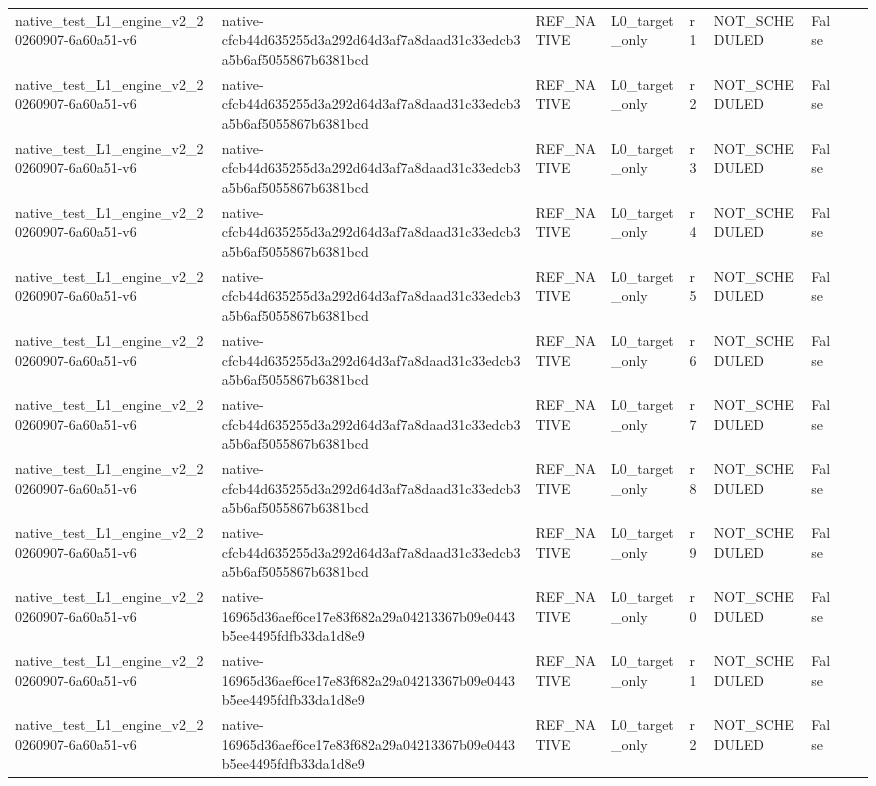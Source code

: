 \begin{tabular}{lllllllll}
native\_test\_L1\_engine\_v2\_20260907-6a60a51-v6 & native-cfcb44d635255d3a292d64d3af7a8daad31c33edcb3a5b6af5055867b6381bcd & REF\_NATIVE & L0\_target\_only & r1 & NOT\_SCHEDULED & False &  &  \\
native\_test\_L1\_engine\_v2\_20260907-6a60a51-v6 & native-cfcb44d635255d3a292d64d3af7a8daad31c33edcb3a5b6af5055867b6381bcd & REF\_NATIVE & L0\_target\_only & r2 & NOT\_SCHEDULED & False &  &  \\
native\_test\_L1\_engine\_v2\_20260907-6a60a51-v6 & native-cfcb44d635255d3a292d64d3af7a8daad31c33edcb3a5b6af5055867b6381bcd & REF\_NATIVE & L0\_target\_only & r3 & NOT\_SCHEDULED & False &  &  \\
native\_test\_L1\_engine\_v2\_20260907-6a60a51-v6 & native-cfcb44d635255d3a292d64d3af7a8daad31c33edcb3a5b6af5055867b6381bcd & REF\_NATIVE & L0\_target\_only & r4 & NOT\_SCHEDULED & False &  &  \\
native\_test\_L1\_engine\_v2\_20260907-6a60a51-v6 & native-cfcb44d635255d3a292d64d3af7a8daad31c33edcb3a5b6af5055867b6381bcd & REF\_NATIVE & L0\_target\_only & r5 & NOT\_SCHEDULED & False &  &  \\
native\_test\_L1\_engine\_v2\_20260907-6a60a51-v6 & native-cfcb44d635255d3a292d64d3af7a8daad31c33edcb3a5b6af5055867b6381bcd & REF\_NATIVE & L0\_target\_only & r6 & NOT\_SCHEDULED & False &  &  \\
native\_test\_L1\_engine\_v2\_20260907-6a60a51-v6 & native-cfcb44d635255d3a292d64d3af7a8daad31c33edcb3a5b6af5055867b6381bcd & REF\_NATIVE & L0\_target\_only & r7 & NOT\_SCHEDULED & False &  &  \\
native\_test\_L1\_engine\_v2\_20260907-6a60a51-v6 & native-cfcb44d635255d3a292d64d3af7a8daad31c33edcb3a5b6af5055867b6381bcd & REF\_NATIVE & L0\_target\_only & r8 & NOT\_SCHEDULED & False &  &  \\
native\_test\_L1\_engine\_v2\_20260907-6a60a51-v6 & native-cfcb44d635255d3a292d64d3af7a8daad31c33edcb3a5b6af5055867b6381bcd & REF\_NATIVE & L0\_target\_only & r9 & NOT\_SCHEDULED & False &  &  \\
native\_test\_L1\_engine\_v2\_20260907-6a60a51-v6 & native-16965d36aef6ce17e83f682a29a04213367b09e0443b5ee4495fdfb33da1d8e9 & REF\_NATIVE & L0\_target\_only & r0 & NOT\_SCHEDULED & False &  &  \\
native\_test\_L1\_engine\_v2\_20260907-6a60a51-v6 & native-16965d36aef6ce17e83f682a29a04213367b09e0443b5ee4495fdfb33da1d8e9 & REF\_NATIVE & L0\_target\_only & r1 & NOT\_SCHEDULED & False &  &  \\
native\_test\_L1\_engine\_v2\_20260907-6a60a51-v6 & native-16965d36aef6ce17e83f682a29a04213367b09e0443b5ee4495fdfb33da1d8e9 & REF\_NATIVE & L0\_target\_only & r2 & NOT\_SCHEDULED & False &  &  \\

\end{tabular}
